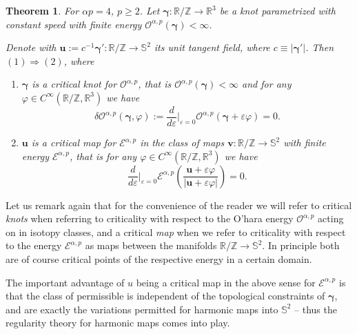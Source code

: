 \documentclass[a4paper,10pt,intlimits,ngerman]{amsart}
\newtheorem{theorem}{Theorem}[section]
\numberwithin{equation}{section}
\newcommand{\R}{\mathbb{R}}
\newcommand{\Z}{\mathbb{Z}}
\renewcommand{\S}{\mathbb{S}}
\newcommand{\solv}{{\boldsymbol{v}}}
\newcommand{\sol}{{\boldsymbol{\gamma}}}
\newcommand{\solu}{{\boldsymbol{u}}}
\newcommand{\brac}[1]{\left ( #1 \right )}
\newcommand{\eps}{\varepsilon}
\begin{document}
\begin{theorem}\label{th:criticalpointchar}
For $\alpha p = 4$, $p \geq 2$. Let $\sol: \R/\Z \to \R^3$ be a knot parametrized with constant speed with finite energy $\mathcal{O}^{\alpha,p}(\sol) < \infty$. 

Denote with $\solu := c^{-1} \sol': \R/\Z \to \S^2$ its unit tangent field, where $c \equiv |\sol'|$.
Then $(1) \Rightarrow (2)$, where
\begin{enumerate}
 \item $\sol$ is a critical knot for $\mathcal{O}^{\alpha,p}$, that is $\mathcal{O}^{\alpha,p}(\sol) < \infty$ and for any $\varphi \in C^\infty(\R/\Z,\R^3)$ we have
\[
 \delta\mathcal{O}^{\alpha,p}(\sol,\varphi) := \frac{d}{d\eps} \Big |_{\eps = 0} \mathcal{O}^{\alpha,p}(\sol+\eps \varphi) = 0.
\]
 \item $\solu$ is a critical map for $\mathcal{E}^{\alpha,p}$ in the class of maps $\solv: \R/\Z \to \S^2$ with finite energy $\mathcal{E}^{\alpha,p}$, that is for any $\varphi \in C^\infty(\R/\Z,\R^3)$ we have
 \[
  \frac{d}{d\eps} \Big |_{\eps = 0} \mathcal{E}^{\alpha,p}\brac{\frac{\solu+\eps \varphi}{|\solu+\eps \varphi|}} = 0.
 \]

\end{enumerate}
\end{theorem}
Let us remark again that for the convenience of the reader we will refer to critical \emph{knots} when referring to criticality with respect to the O'hara energy $\mathcal{O}^{\alpha,p}$ acting on in isotopy classes, and a critical \emph{map} when we refer to criticality with respect to the energy $\mathcal{E}^{\alpha,p}$ as maps between the manifolds $\R/\Z \to \S^2$. In principle both are of course critical points of the respective energy in a certain domain.

The important advantage of $u$ being a critical map in the above sense for $\mathcal{E}^{\alpha,p}$ is that the class of permissible is independent of the topological constraints of $\sol$, and are exactly the variations permitted for harmonic maps into $\S^2$ -- thus the regularity theory for harmonic maps comes into play.
\end{document}
